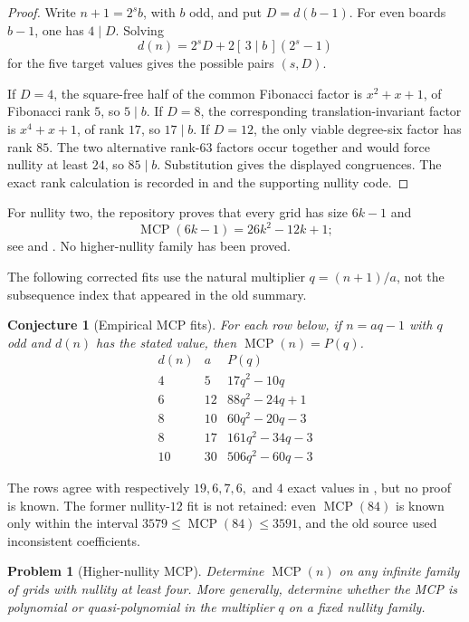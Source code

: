 \documentclass[a4paper]{article}
\newtheorem{conjecture}[theorem]{Conjecture}
\newtheorem{problem}[theorem]{Problem}
\DeclareMathOperator{\MCP}{MCP}
\begin{document}
\begin{proof}
	Write $n+1=2^sb$, with $b$ odd, and put $D=d(b-1)$.
	For even boards $b-1$, one has $4\mid D$.  Solving
	\[
		d(n)=2^sD+2[\,3\mid b\,](2^s-1)
	\]
	for the five target values gives the possible pairs $(s,D)$.

	If $D=4$, the square-free half of the common Fibonacci factor is
	$x^2+x+1$, of Fibonacci rank $5$, so $5\mid b$.
	If $D=8$, the corresponding translation-invariant factor is
	$x^4+x+1$, of rank $17$, so $17\mid b$.
	If $D=12$, the only viable degree-six factor has rank $85$.
	The two alternative rank-$63$ factors occur together and would force
	nullity at least $24$, so $85\mid b$.  Substitution gives the displayed
	congruences.  The exact rank calculation is recorded in
	 and the
	supporting nullity code.
\end{proof}

For nullity two, the repository proves that every grid has size $6k-1$ and
\[
	\MCP(6k-1)=26k^2-12k+1;
\]
see  and \cite{BoylesMostClicks}.
No higher-nullity family has been proved.

The following corrected fits use the natural multiplier
$q=(n+1)/a$, not the subsequence index that appeared in the old summary.

\begin{conjecture}[Empirical MCP fits]\label{conj:mcp-fits}
	For each row below, if $n=aq-1$ with $q$ odd and $d(n)$ has the stated
	value, then $\MCP(n)=P(q)$.
	\[
	\begin{array}{ccl}
	d(n)&a&P(q)\\
	\hline
	4&5&17q^2-10q\\
	6&12&88q^2-24q+1\\
	8&10&60q^2-20q-3\\
	8&17&161q^2-34q-3\\
	10&30&506q^2-60q-3
	\end{array}
	\]
\end{conjecture}

The rows agree with respectively $19,6,7,6,$ and $4$ exact values in
, but no proof is known.
The former nullity-$12$ fit is not retained: even $\MCP(84)$ is known only
within the interval $3579\leq\MCP(84)\leq3591$, and the old source used
inconsistent coefficients.

\begin{problem}[Higher-nullity MCP]\label{prob:higher-mcp}
	Determine $\MCP(n)$ on any infinite family of grids with nullity at
	least four.  More generally, determine whether the MCP is polynomial or
	quasi-polynomial in the multiplier $q$ on a fixed nullity family.
\end{problem}
\end{document}
